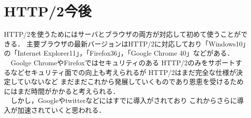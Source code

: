 \documentclass[a4j,9pt,twocolumn]{jsarticle}
\begin{document}
\section{HTTP/2今後}
HTTP/2を使うためにはサーバとブラウザの両方が対応して初めて使うことができる．
主要ブラウザの最新バージョンはHTTP/2に対応しており「Windows10」の「Internet Explorer11」，「Firefox36」，「Google Chrome 40」などがある．
\\　Goolge ChromeやFirefoxではセキュリティのある
HTTP/2のみをサポートするなどセキュリティ面での向上も考えられるが
HTTP/2はまだ完全な仕様が決定していないなど
まだまだこれから発展していくものであり恩恵を受けるためにはまだ時間がかかると考えられる．
\\　しかし，Googleやtwitterなどにはすでに導入がされており
これからさらに導入が加速されていくと思われる．




\small


\end{document}
